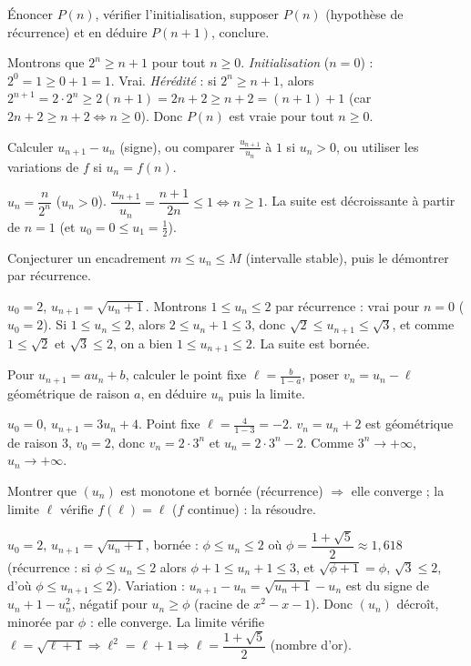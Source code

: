 Énoncer $P(n)$, vérifier l'initialisation, supposer $P(n)$ (hypothèse de récurrence) et en déduire $P(n+1)$, conclure.
\begin{exemple}
Montrons que $2^n\ge n+1$ pour tout $n\ge0$.
\emph{Initialisation} ($n=0$) : $2^0=1\ge0+1=1$. Vrai.
\emph{Hérédité} : si $2^n\ge n+1$, alors $2^{n+1}=2\cdot2^n\ge2(n+1)=2n+2\ge n+2=(n+1)+1$
(car $2n+2\ge n+2\iff n\ge0$). Donc $P(n)$ est vraie pour tout $n\ge0$.
\end{exemple}

Calculer $u_{n+1}-u_n$ (signe), ou comparer $\tfrac{u_{n+1}}{u_n}$ à $1$ si $u_n>0$, ou utiliser les variations de $f$ si $u_n=f(n)$.
\begin{exemple}
$u_n=\dfrac{n}{2^n}$ ($u_n>0$). $\dfrac{u_{n+1}}{u_n}=\dfrac{n+1}{2n}\le1\iff n\ge1$.
La suite est décroissante à partir de $n=1$ (et $u_0=0\le u_1=\tfrac12$).
\end{exemple}

Conjecturer un encadrement $m\le u_n\le M$ (intervalle stable), puis le démontrer par récurrence.
\begin{exemple}
$u_0=2$, $u_{n+1}=\sqrt{u_n+1}$. Montrons $1\le u_n\le2$ par récurrence : vrai pour $n=0$
($u_0=2$). Si $1\le u_n\le2$, alors $2\le u_n+1\le3$, donc $\sqrt2\le u_{n+1}\le\sqrt3$,
et comme $1\le\sqrt2$ et $\sqrt3\le2$, on a bien $1\le u_{n+1}\le2$. La suite est bornée.
\end{exemple}

Pour $u_{n+1}=au_n+b$, calculer le point fixe $\ell=\tfrac{b}{1-a}$, poser $v_n=u_n-\ell$ géométrique de raison $a$, en déduire $u_n$ puis la limite.
\begin{exemple}
$u_0=0$, $u_{n+1}=3u_n+4$. Point fixe $\ell=\tfrac{4}{1-3}=-2$.
$v_n=u_n+2$ est géométrique de raison $3$, $v_0=2$, donc $v_n=2\cdot3^n$ et $u_n=2\cdot3^n-2$.
Comme $3^n\to+\infty$, $u_n\to+\infty$.
\end{exemple}

Montrer que $(u_n)$ est monotone et bornée (récurrence) $\Rightarrow$ elle converge ; la limite $\ell$ vérifie $f(\ell)=\ell$ ($f$ continue) : la résoudre.
\begin{exemple}
$u_0=2$, $u_{n+1}=\sqrt{u_n+1}$, bornée : $\phi\le u_n\le2$ où $\phi=\dfrac{1+\sqrt5}{2}\approx1{,}618$
(récurrence : si $\phi\le u_n\le2$ alors $\phi+1\le u_n+1\le3$, et $\sqrt{\phi+1}=\phi$, $\sqrt3\le2$,
d'où $\phi\le u_{n+1}\le2$). Variation : $u_{n+1}-u_n=\sqrt{u_n+1}-u_n$ est du signe de
$u_n+1-u_n^2$, négatif pour $u_n\ge\phi$ (racine de $x^2-x-1$). Donc $(u_n)$ décroît, minorée par $\phi$ :
elle converge. La limite vérifie $\ell=\sqrt{\ell+1}\Rightarrow\ell^2=\ell+1\Rightarrow\ell=\dfrac{1+\sqrt5}{2}$ (nombre d'or).
\end{exemple}

